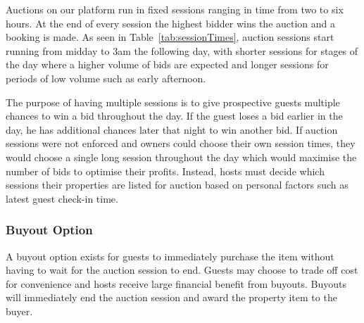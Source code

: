 Auctions on our platform run in fixed sessions ranging in time from two to six hours.
At the end of every session the highest bidder wins the auction and a booking is made.
As seen in Table~\ref{tab:sessionTimes},
auction sessions start running from midday to 3am the following day, with shorter sessions
for stages of the day where a higher volume of bids are expected and longer sessions
for periods of low volume such as early afternoon.

The purpose of having multiple sessions is to give prospective guests multiple chances to
win a bid throughout the day. If the guest loses a bid earlier in the day, he has
additional chances later that night to win another bid. If auction
sessions were not enforced and owners could choose their own session times, they
would choose a single long session throughout the day which would
maximise the number of bids to optimise their profits.
Instead, hosts must decide which sessions their properties are listed for auction
based on personal factors such as latest guest check-in time.

\subsubsection{Buyout Option}
A buyout option exists for guests to immediately purchase
the item without having to wait for the auction session to end. Guests may choose to
trade off cost for convenience and hosts receive large financial benefit from buyouts.
Buyouts will immediately end the auction session and award the property item to the buyer.
